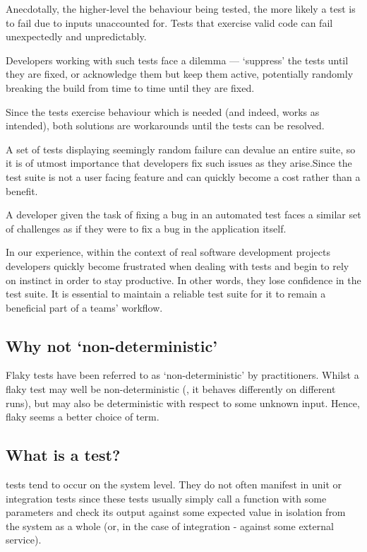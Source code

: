 Anecdotally, the higher-level the behaviour being tested, the more likely a test is to fail due to inputs unaccounted for. Tests that exercise valid code can fail unexpectedly and unpredictably.

Developers working with such tests face a dilemma --- {\lq}suppress{\rq} the tests until they are fixed, or acknowledge them but keep them active, potentially randomly breaking the build from time to time until they are fixed.

Since the tests exercise behaviour which is needed (and indeed, works as intended), both solutions are workarounds until the tests can be resolved.

A set of tests displaying seemingly random failure can devalue an entire suite, so it is of utmost importance that developers fix such issues as they arise.Since the test suite is not a user facing feature and can quickly become a cost rather than a benefit.

A developer given the task of fixing a bug in an automated test faces a similar set of challenges as if they were to fix a bug in the application itself.

In our experience, within the context of real software development projects developers quickly become frustrated when dealing with \flaky{} tests and begin to rely on instinct in order to stay productive. In other words, they lose confidence in the test suite. It is essential to maintain a reliable test suite for it to remain a beneficial part of a teams' workflow.


\subsection{Why not {\lq}non-deterministic{\rq}}

Flaky tests have been referred to as {\lq}non-deterministic{\rq} by practitioners. Whilst a flaky test may well be non-deterministic (\ie, it behaves differently on different runs), but may also be deterministic with respect to some unknown input. Hence, flaky seems a better choice of term.


\subsection{What is a \flaky{} test?}

\flaky{} tests tend to occur on the system level. They do not often manifest in unit or integration tests since these tests usually simply call a function with some parameters and check its output against some expected value in isolation from the system as a whole (or, in the case of integration - against some external service).

